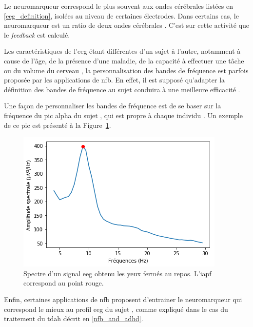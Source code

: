 Le neuromarqueur correspond le plus souvent aux ondes cérébrales listées en \ref{eeg_definition}, isolées au 
niveau de certaines électrodes. Dans certains cas, le neuromarqueur est un ratio de deux ondes cérébrales \citep{Gevensleben2009}. C'est sur cette activité que le \textit{feedback}
est calculé. 

Les caractéristiques de l'\gls{eeg} étant différentes d'un sujet à l'autre, notamment à cause de l'âge, de la présence d'une maladie, de la capacité à effectuer une tâche ou du volume 
du cerveau \citep{Enriquez2017, Klimesch1999, Moretti2004, Alkoby2017}, la personnalisation des bandes de fréquence est parfois proposée par les applications de \gls{nfb}. 
En effet, il est supposé qu'adapter la définition des bandes de fréquence au sujet conduira à une meilleure efficacité \citep{Enriquez2017}. 

Une façon de personnaliser les bandes de fréquence est de se baser sur la fréquence du pic alpha du sujet \citep{Alkoby2017, Escolano2014, Bazanova2018, Bioulac2019}, qui 
est propre à chaque individu \citep{Haegens2014, Aurlien2004, Smit2006}. Un exemple de ce pic est présenté à la Figure~\ref{Figure:introduction_iapf}.

\begin{figure}[h!]
  \centering
	\includegraphics[width=0.7\linewidth]{figures/chapter-1/introduction-iapf} 
  \caption[Spectre d'un signal \gls{eeg} obtenu les yeux fermés au repos.]{Spectre d'un signal \gls{eeg} obtenu les yeux fermés au repos. L'\gls{iapf} correspond au point rouge.}
  \label{Figure:introduction_iapf}
\end{figure}

Enfin, certaines applications de \gls{nfb} proposent d'entrainer le neuromarqueur qui correspond le mieux au profil \gls{eeg} du sujet 
\citep{Bioulac2019, Kerson2013}, comme expliqué dans le cas du traitement du \gls{tdah} décrit en \ref{nfb_and_adhd}. 

